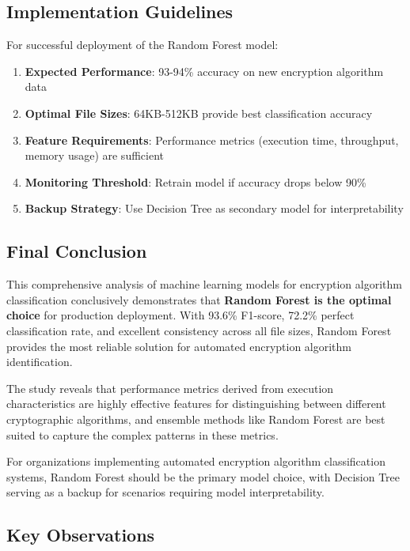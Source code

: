 \documentclass[12pt]{article}
\begin{document}
\subsection{Implementation Guidelines}

For successful deployment of the Random Forest model:

\begin{enumerate}
    \item \textbf{Expected Performance}: 93-94\% accuracy on new encryption algorithm data
    \item \textbf{Optimal File Sizes}: 64KB-512KB provide best classification accuracy
    \item \textbf{Feature Requirements}: Performance metrics (execution time, throughput, memory usage) are sufficient
    \item \textbf{Monitoring Threshold}: Retrain model if accuracy drops below 90\%
    \item \textbf{Backup Strategy}: Use Decision Tree as secondary model for interpretability
\end{enumerate}

\subsection{Final Conclusion}

This comprehensive analysis of machine learning models for encryption algorithm classification conclusively demonstrates that \textbf{Random Forest is the optimal choice} for production deployment. With 93.6\% F1-score, 72.2\% perfect classification rate, and excellent consistency across all file sizes, Random Forest provides the most reliable solution for automated encryption algorithm identification.

The study reveals that performance metrics derived from execution characteristics are highly effective features for distinguishing between different cryptographic algorithms, and ensemble methods like Random Forest are best suited to capture the complex patterns in these metrics.

For organizations implementing automated encryption algorithm classification systems, Random Forest should be the primary model choice, with Decision Tree serving as a backup for scenarios requiring model interpretability.

\subsection{Key Observations}
\end{document}
